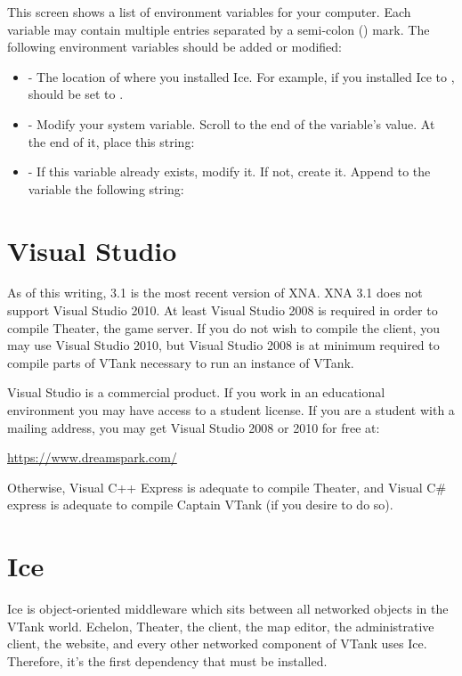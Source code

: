 This screen shows a list of environment variables for your computer. Each variable may contain multiple entries separated by a semi-colon (\command{;}) mark. The following environment variables should be added or modified:

\begin{itemize}
	\item {} - The location of where you installed Ice. For example, if you installed Ice to ,  should be set to .
	\item {} - Modify your  system variable. Scroll to the end of the variable's value. At the end of it, place this string:\
	\item {} - If this variable already exists, modify it. If not, create it. Append to the variable the following string:\
\end{itemize}

\section{Visual Studio}

As of this writing, 3.1 is the most recent version of XNA. XNA 3.1 does not support Visual Studio 2010. At least Visual Studio 2008 is required in order to compile Theater, the game server. If you do not wish to compile the client, you may use Visual Studio 2010, but Visual Studio 2008 is at minimum required to compile parts of VTank necessary to run an instance of VTank.

Visual Studio is a commercial product. If you work in an educational environment you may have access to a student license. If you are a student with a \command{.edu} mailing address, you may get Visual Studio 2008 or 2010 for free at:

\url{https://www.dreamspark.com/}

Otherwise, Visual C++ Express is adequate to compile Theater, and Visual C\# express is adequate to compile Captain VTank (if you desire to do so).

\section{Ice}

Ice is object-oriented middleware which sits between all networked objects in the VTank world. Echelon, Theater, the client, the map editor, the administrative client, the website, and every other networked component of VTank uses Ice. Therefore, it's the first dependency that must be installed.

